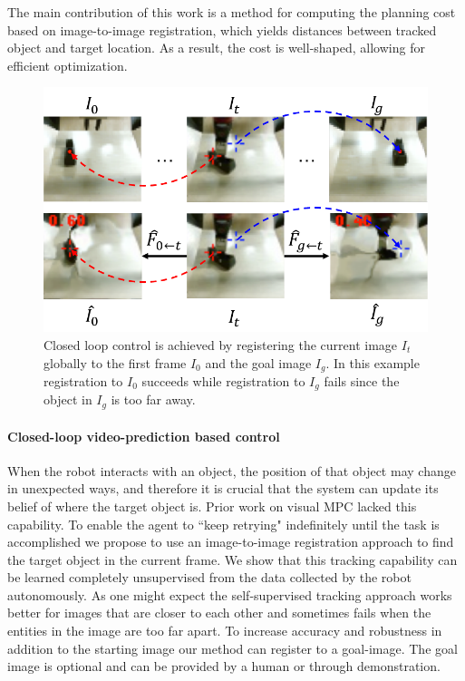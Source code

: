 The main contribution of this work is a method for computing the planning cost based on image-to-image registration, which yields distances between tracked object and target location. As a result, the cost is well-shaped, allowing for efficient optimization.

\begin{figure}
\vspace{-0.25in}
\centering
\includegraphics[width=0.5\columnwidth]{images/registration_singletime.pdf}
\caption{\small{Closed loop control is achieved by registering the current image $I_t$ globally to the first frame $I_0$ and the goal image $I_g$. In this example registration to $I_0$ succeeds while registration to $I_g$ fails since the object in $I_g$ is too far away.}
\label{fig:reg_single}
\vspace{-0.2in}
}
\end{figure}


\paragraph{Closed-loop video-prediction based control}

When the robot interacts with an object, the position of that object may change in unexpected ways, and therefore it is crucial that the system can update its belief of where the target object is. Prior work on visual MPC lacked this capability. To enable the agent to ``keep retrying" indefinitely until the task is accomplished we propose to use an image-to-image registration approach to find the target object in the current frame. 
We show that this tracking capability can be learned completely unsupervised from the data collected by the robot autonomously. As one might expect the self-supervised tracking approach works better for images that are closer to each other and sometimes fails when the entities in the image are too far apart. To increase accuracy and robustness in addition to the starting image our method can register to a goal-image. The goal image is optional and can be provided by a human or through demonstration.

